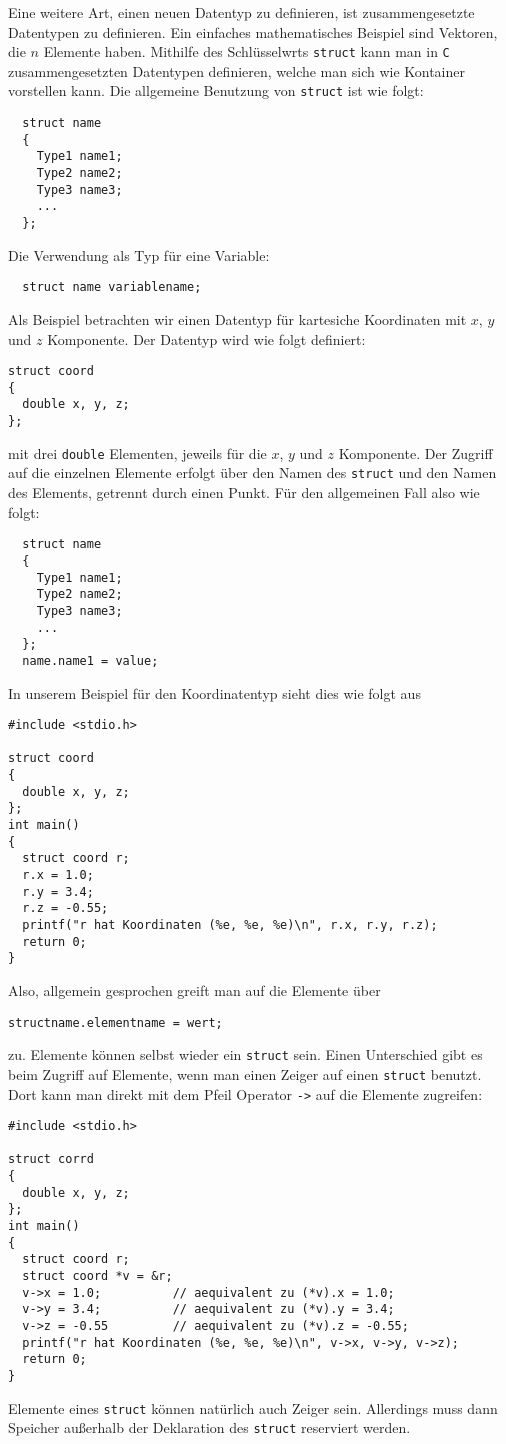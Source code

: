 Eine weitere Art, einen neuen Datentyp zu definieren, ist zusammengesetzte Datentypen zu definieren.
Ein einfaches mathematisches Beispiel sind Vektoren, die $n$ Elemente haben.
Mithilfe des Schlüsselwrts \verb|struct| kann man in \texttt{C} zusammengesetzten Datentypen definieren, welche man sich wie Kontainer vorstellen kann.
Die allgemeine Benutzung von \verb|struct| ist wie folgt:
\begin{lstlisting}
  struct name
  {
    Type1 name1;
    Type2 name2;
    Type3 name3;
    ...
  };
\end{lstlisting}
Die Verwendung als Typ für eine Variable:
\begin{lstlisting}
  struct name variablename;
\end{lstlisting}
Als Beispiel betrachten wir einen Datentyp für kartesiche Koordinaten mit $x$, $y$ und $z$ Komponente.
Der Datentyp wird wie folgt definiert:
\begin{lstlisting}
struct coord
{
  double x, y, z;
};
\end{lstlisting}
mit drei \verb|double| Elementen, jeweils für die $x$, $y$ und $z$ Komponente.
Der Zugriff auf die einzelnen Elemente erfolgt über den Namen des \verb|struct| und den Namen des Elements, getrennt durch einen Punkt.
Für den allgemeinen Fall also wie folgt:
\begin{lstlisting}
  struct name
  {
    Type1 name1;
    Type2 name2;
    Type3 name3;
    ...
  };
  name.name1 = value;
\end{lstlisting}
In unserem Beispiel für den Koordinatentyp sieht dies wie folgt aus
\begin{lstlisting}
#include <stdio.h>

struct coord
{
  double x, y, z;
};
int main()
{
  struct coord r;
  r.x = 1.0;
  r.y = 3.4;
  r.z = -0.55;
  printf("r hat Koordinaten (%e, %e, %e)\n", r.x, r.y, r.z);
  return 0;
}
\end{lstlisting}
Also, allgemein gesprochen greift man auf die Elemente über 
\begin{lstlisting}
structname.elementname = wert;
\end{lstlisting}
zu.
Elemente können selbst wieder ein \verb|struct| sein.
Einen Unterschied gibt es beim Zugriff auf Elemente, wenn man einen Zeiger auf einen \verb|struct| benutzt.
Dort kann man direkt mit dem Pfeil Operator \verb|->| auf die Elemente zugreifen:
\begin{lstlisting}
#include <stdio.h>

struct corrd
{
  double x, y, z;
};
int main()
{
  struct coord r;
  struct coord *v = &r;
  v->x = 1.0;          // aequivalent zu (*v).x = 1.0;
  v->y = 3.4;          // aequivalent zu (*v).y = 3.4;
  v->z = -0.55         // aequivalent zu (*v).z = -0.55;
  printf("r hat Koordinaten (%e, %e, %e)\n", v->x, v->y, v->z);
  return 0;
}
\end{lstlisting}
Elemente eines \verb|struct| können natürlich auch Zeiger sein.
Allerdings muss dann Speicher außerhalb der Deklaration des \texttt{struct} reserviert werden.

